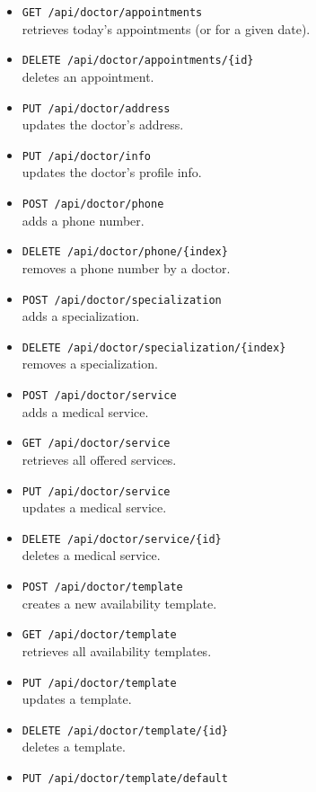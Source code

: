\begin{itemize}
	\item \texttt{GET /api/doctor/appointments} \\
	retrieves today's appointments (or for a given date).
	\item \texttt{DELETE /api/doctor/appointments/\{id\}} \\
	deletes an appointment.
	\item \texttt{PUT /api/doctor/address} \\
	updates the doctor's address.
	\item \texttt{PUT /api/doctor/info} \\
	updates the doctor's profile info.
	\item \texttt{POST /api/doctor/phone} \\
	adds a phone number.
	\item \texttt{DELETE /api/doctor/phone/\{index\}} \\
	removes a phone number by a doctor.
	\item \texttt{POST /api/doctor/specialization} \\
	adds a specialization.
	\item \texttt{DELETE /api/doctor/specialization/\{index\}} \\
	removes a specialization.
	\item \texttt{POST /api/doctor/service} \\
	adds a medical service.
	\item \texttt{GET /api/doctor/service} \\
	retrieves all offered services.
	\item \texttt{PUT /api/doctor/service} \\
	updates a medical service.
	\item \texttt{DELETE /api/doctor/service/\{id\}} \\
	deletes a medical service.
	\item \texttt{POST /api/doctor/template} \\
	creates a new availability template.
	\item \texttt{GET /api/doctor/template} \\
	retrieves all availability templates.
	\item \texttt{PUT /api/doctor/template} \\
	updates a template. 
	\item \texttt{DELETE /api/doctor/template/\{id\}} \\
	deletes a template.
	\item \texttt{PUT /api/doctor/template/default} \\

\end{itemize}
